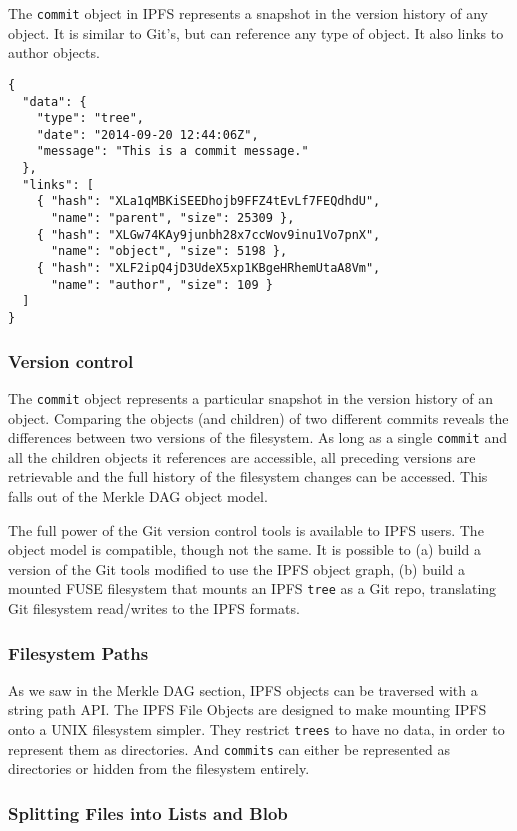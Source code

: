 \documentclass{sig-alternate}
\begin{document}
The \texttt{commit} object in IPFS represents a snapshot in the version history of any object. It is similar to Git's, but can reference any type of object. It also links to author objects.

\begin{verbatim}
{
  "data": {
    "type": "tree",
    "date": "2014-09-20 12:44:06Z",
    "message": "This is a commit message."
  },
  "links": [
    { "hash": "XLa1qMBKiSEEDhojb9FFZ4tEvLf7FEQdhdU",
      "name": "parent", "size": 25309 },
    { "hash": "XLGw74KAy9junbh28x7ccWov9inu1Vo7pnX",
      "name": "object", "size": 5198 },
    { "hash": "XLF2ipQ4jD3UdeX5xp1KBgeHRhemUtaA8Vm",
      "name": "author", "size": 109 }
  ]
}
\end{verbatim}

\subsubsection{Version control}

The \texttt{commit} object represents a particular snapshot in the version
history of an object. Comparing the objects (and children) of two
different commits reveals the differences between two versions of the
filesystem. As long as a single \texttt{commit} and all the children objects
it references are accessible, all preceding versions are retrievable and the
full history of the filesystem changes can be accessed. This falls out
of the Merkle DAG object model.

The full power of the Git version control tools is available to IPFS users. The object model is compatible, though not the same. It is possible to (a) build a version of the Git tools modified to use the IPFS object graph, (b) build a mounted FUSE filesystem that mounts an IPFS \texttt{tree} as a Git repo, translating Git filesystem read/writes to the IPFS formats.


\subsubsection{Filesystem Paths}

As we saw in the Merkle DAG section, IPFS objects can be traversed with a string path API. The IPFS File Objects are designed to make mounting IPFS onto a UNIX filesystem simpler. They restrict \texttt{trees} to have no data, in order to represent them as directories. And \texttt{commits} can either be represented as directories or hidden from the filesystem entirely.

\subsubsection{Splitting Files into Lists and Blob}
\end{document}
